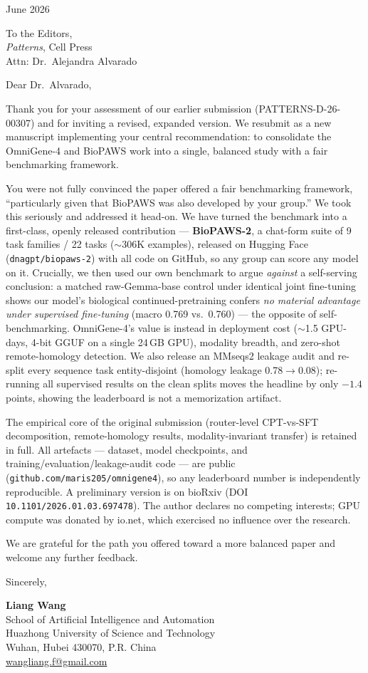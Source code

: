 \documentclass[11pt]{article}
\begin{document}
\hfill June 2026

\medskip

To the Editors,\\
\textit{Patterns}, Cell Press\\
Attn: Dr.\ Alejandra Alvarado

\medskip

Dear Dr.\ Alvarado,

Thank you for your assessment of our earlier submission (PATTERNS-D-26-00307) and for
inviting a revised, expanded version. We resubmit as a new manuscript implementing your
central recommendation: to consolidate the OmniGene-4 and BioPAWS work into a single,
balanced study with a fair benchmarking framework.

You were not fully convinced the paper offered a fair benchmarking framework, ``particularly
given that BioPAWS was also developed by your group.'' We took this seriously and addressed
it head-on. We have turned the benchmark into a first-class, openly released contribution ---
\textbf{BioPAWS-2}, a chat-form suite of 9 task families / 22 tasks ($\sim$306K examples),
released on Hugging Face (\texttt{dnagpt/biopaws-2}) with all code on GitHub, so any group
can score any model on it. Crucially, we then used our own benchmark to argue \emph{against}
a self-serving conclusion: a matched raw-Gemma-base control under identical joint fine-tuning
shows our model's biological continued-pretraining confers \emph{no material advantage under
supervised fine-tuning} (macro 0.769 vs.\ 0.760) --- the opposite of self-benchmarking.
OmniGene-4's value is instead in deployment cost ($\sim$1.5 GPU-days, 4-bit GGUF on a single
24\,GB GPU), modality breadth, and zero-shot remote-homology detection. We also release an
MMseqs2 leakage audit and re-split every sequence task entity-disjoint (homology leakage
0.78$\to$0.08); re-running all supervised results on the clean splits moves the headline by
only $-1.4$ points, showing the leaderboard is not a memorization artifact.

The empirical core of the original submission (router-level CPT-vs-SFT decomposition,
remote-homology results, modality-invariant transfer) is retained in full. All artefacts ---
dataset, model checkpoints, and training/evaluation/leakage-audit code --- are public
(\texttt{github.com/maris205/omnigene4}), so any leaderboard number is independently
reproducible. A preliminary version is on bioRxiv (DOI \texttt{10.1101/2026.01.03.697478}).
The author declares no competing interests; GPU compute was donated by io.net, which
exercised no influence over the research.

We are grateful for the path you offered toward a more balanced paper and welcome any further
feedback.

\medskip

Sincerely,

\medskip

\textbf{Liang Wang}\\
School of Artificial Intelligence and Automation\\
Huazhong University of Science and Technology\\
Wuhan, Hubei 430070, P.R. China\\
\href{mailto:wangliang.f@gmail.com}{wangliang.f@gmail.com}
\end{document}
